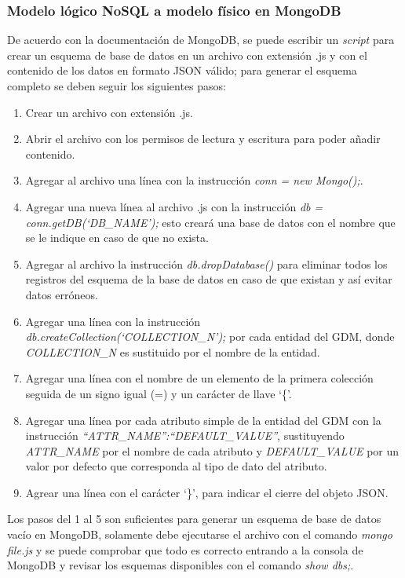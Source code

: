 \subsubsection{Modelo lógico NoSQL a modelo físico en MongoDB}


De acuerdo con la documentación de MongoDB\cite{mongodb_mongodb_2020}, se puede escribir un \textit{script} para crear un esquema  de base de datos en un archivo con extensión .js y con el contenido de los datos en formato JSON válido; para generar el esquema completo se deben seguir los siguientes pasos:


\begin{enumerate}
    \item Crear un archivo con extensión .js.
    \item Abrir el archivo con los permisos de lectura y escritura para poder añadir contenido.
    \item Agregar al archivo una línea con la instrucción \textit{conn = new Mongo();}.
    \item Agregar una nueva línea al archivo .js con la instrucción \textit{db = conn.getDB(`DB\_NAME');} esto creará una base de datos con el nombre que se le indique en caso de que no exista.
    \item Agregar al archivo la instrucción \textit{db.dropDatabase()} para eliminar todos los registros del esquema de la base de datos en caso de que existan y así evitar datos erróneos.
    \item Agregar una línea con la instrucción \textit{db.createCollection(`COLLECTION\_N');} por cada entidad del GDM, donde \textit{COLLECTION\_N} es sustituido por el nombre de la entidad.
    \item Agregar una línea con el nombre de un elemento de la primera colección seguida de un signo igual (=) y un carácter de llave `\{'.
    \item Agregar una línea por cada atributo simple de la entidad del GDM con la instrucción \textit{``ATTR\_NAME'':``DEFAULT\_VALUE''}, sustituyendo \textit{ATTR\_NAME} por el nombre de cada atributo y \textit{DEFAULT\_VALUE} por un valor por defecto que corresponda al tipo de dato del atributo.
    \item Agrear una línea con el carácter `\}', para indicar el cierre del objeto JSON.
\end{enumerate}


Los pasos del 1 al 5 son suficientes para generar un esquema de base de datos vacío en MongoDB, solamente debe ejecutarse el archivo con el comando \textit{mongo file.js} y se puede comprobar que todo es correcto entrando a la consola de MongoDB y revisar los esquemas disponibles con el comando \textit{show dbs;}.


